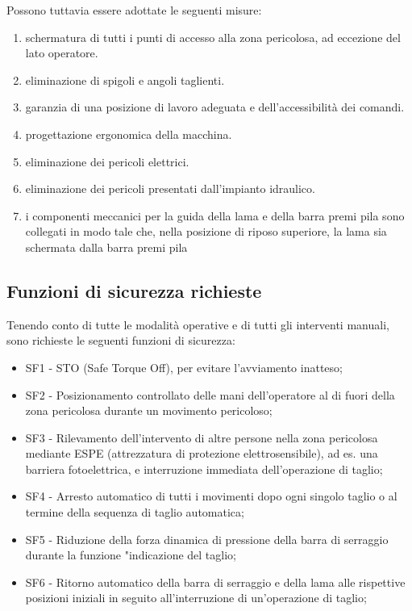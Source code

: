 Possono tuttavia essere adottate le seguenti misure:
\begin{enumerate}
    \item schermatura di tutti i punti di accesso alla zona pericolosa, ad eccezione del lato operatore.
    \item eliminazione di spigoli e angoli taglienti.
    \item garanzia di una posizione di lavoro adeguata e dell'accessibilità dei comandi.
    \item progettazione ergonomica della macchina.
    \item eliminazione dei pericoli elettrici.
    \item eliminazione dei pericoli presentati dall'impianto idraulico.
    \item i componenti meccanici per la guida della lama e della barra premi pila sono collegati in modo tale che, nella posizione di riposo superiore, la lama sia schermata dalla barra premi pila
\end{enumerate}

\subsection{Funzioni di sicurezza richieste}
\label{subsec:05-7-3}
Tenendo conto di tutte le modalità operative e di tutti gli interventi manuali, sono richieste le seguenti funzioni di sicurezza:
\begin{itemize}
    \item SF1 - STO (Safe Torque Off), per evitare l'avviamento inatteso;
    \item SF2 - Posizionamento controllato delle mani dell'operatore al di fuori della zona pericolosa durante un movimento pericoloso;
    \item SF3 - Rilevamento dell'intervento di altre persone nella zona pericolosa mediante ESPE (attrezzatura di protezione elettrosensibile), ad es. una barriera fotoelettrica, e interruzione immediata dell'operazione di taglio;
    \item SF4 - Arresto automatico di tutti i movimenti dopo ogni singolo taglio o al termine della sequenza di taglio automatica;
    \item SF5 - Riduzione della forza dinamica di pressione della barra di serraggio durante la funzione "indicazione del taglio;
    \item SF6 - Ritorno automatico della barra di serraggio e della lama alle rispettive posizioni iniziali in seguito all'interruzione di un'operazione di taglio;
\end{itemize}

